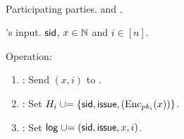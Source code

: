 \begin{protocol}~\label{prot:ConfidentialTransactions:Issue}
	\item[Participating parties.] \Ic and \Cc.
	
	
	\item[\Cc's input.] $\mathsf{sid}$, $x\in {\mathbb{N}}$ and $i\in [n]$.
	
	\item Operation:
	
	
	\begin{enumerate}
		
		\item   \Ic: Send $(x,i)$ to \Cc.
		
		\item \Cc:  Set $H_i \unioneq \set{\sid,\issue,(\Enc_{pk_i}(x))}$.
	
	 \item \Cc:  Set $\mathsf{log} \mathrel{\cup}= (\mathsf{sid},\mathsf{issue},x,i)$.
		
	\end{enumerate}
\end{protocol}



